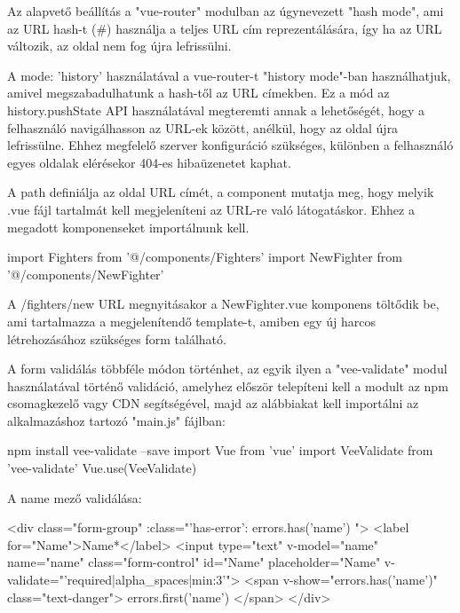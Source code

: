 Az alapvető beállítás a "vue-router" modulban az úgynevezett "hash mode", ami az URL hash-t (\#) használja a teljes URL cím reprezentálására, így ha az URL változik, az oldal nem fog újra lefrissülni.

A mode: ’history’ használatával a vue-router-t "history mode"-ban használhatjuk, amivel megszabadulhatunk a hash-től az URL címekben. Ez a mód az history.pushState API használatával megteremti annak a lehetőségét, hogy a felhasználó navigálhasson az URL-ek között, anélkül, hogy az oldal újra lefrissülne. Ehhez megfelelő szerver konfiguráció szükséges, különben a felhasználó egyes oldalak elérésekor 404-es hibaüzenetet kaphat.

A path definiálja az oldal URL címét, a component mutatja meg, hogy melyik .vue fájl tartalmát kell megjeleníteni az URL-re való látogatáskor. Ehhez a megadott komponenseket importálnunk kell.

\begin{cpp}
import Fighters from '@/components/Fighters'
import NewFighter from '@/components/NewFighter'
\end{cpp}

A /fighters/new URL megnyitásakor a NewFighter.vue komponens töltődik be, ami tartalmazza a megjelenítendő template-t, amiben egy új harcos létrehozásához szükséges form található.


A form validálás többféle módon történhet, az egyik ilyen a "vee-validate" modul használatával történő validáció, amelyhez először telepíteni kell a modult az npm csomagkezelő vagy CDN segítségével, majd az alábbiakat kell importálni az alkalmazáshoz tartozó "main.js" fájlban:

\begin{cpp}
npm install vee-validate --save
import Vue from 'vue'
import VeeValidate from 'vee-validate'
Vue.use(VeeValidate)
\end{cpp}

A name mező validálása:

\begin{cpp}
<div class="form-group" :class="{'has-error': errors.has('name') }">
<label for="Name">Name*</label>
<input type="text" v-model="name" name="name" class="form-control" 
   	id="Name" placeholder="Name" 
   	v-validate="'required|alpha_spaces|min:3'"> 
	<span v-show="errors.has('name')" class="text-danger">
	{{ errors.first('name') }}</span>
</div>
\end{cpp}

